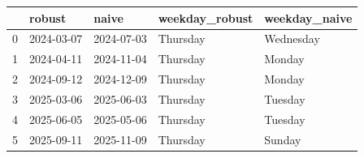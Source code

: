 \begin{tabular}{lllll}
\toprule
 & robust & naive & weekday\_robust & weekday\_naive \\
\midrule
0 & 2024-03-07 & 2024-07-03 & Thursday & Wednesday \\
1 & 2024-04-11 & 2024-11-04 & Thursday & Monday \\
2 & 2024-09-12 & 2024-12-09 & Thursday & Monday \\
3 & 2025-03-06 & 2025-06-03 & Thursday & Tuesday \\
4 & 2025-06-05 & 2025-05-06 & Thursday & Tuesday \\
5 & 2025-09-11 & 2025-11-09 & Thursday & Sunday \\
\bottomrule
\end{tabular}

